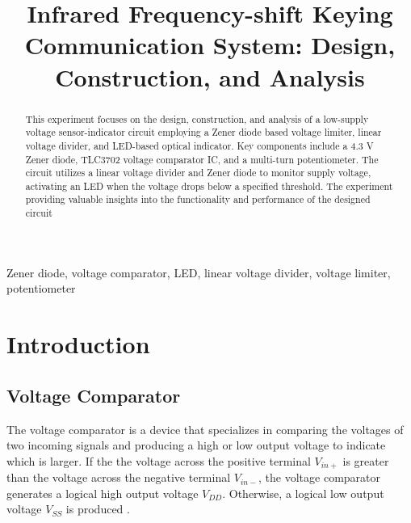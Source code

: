 \documentclass[conference]{IEEEtran}
\begin{document}
\title{ Infrared Frequency-shift Keying Communication System: Design, Construction, and Analysis}

\author{
}

\maketitle

\begin{abstract}
This experiment focuses on the design, construction, and analysis of a low-supply voltage sensor-indicator circuit employing a Zener diode based voltage limiter, linear voltage divider, and LED-based optical indicator. Key components include a 4.3 V Zener diode, TLC3702 voltage comparator IC, and a multi-turn potentiometer. The circuit utilizes a linear voltage divider and Zener diode to monitor supply voltage, activating an LED when the voltage drops below a specified threshold. The experiment providing valuable insights into the functionality and performance of the designed circuit

\end{abstract}

\begin{IEEEkeywords}
Zener diode, voltage comparator, LED, linear voltage divider, voltage limiter, potentiometer
\end{IEEEkeywords}

\section{Introduction}

\subsection{Voltage Comparator}

The voltage comparator is a device that specializes in comparing the voltages of two incoming signals and producing a high or low output voltage to indicate which is larger. If the the voltage across the positive terminal $V_{in+}$ is greater than the voltage across the negative terminal $V_{in-}$, the voltage comparator generates a logical high output voltage $V_{DD}$. Otherwise, a logical low output voltage $V_{SS}$ is produced \cite{week6}.
\end{document}
